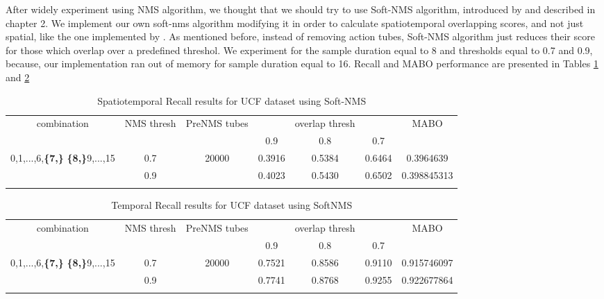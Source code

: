 After widely experiment using NMS algorithm, we thought that we should try to use Soft-NMS algorithm, introduced by \cite{DBLP:journals/corr/BodlaSCD17} and described in chapter 2. We implement our own soft-nms algorithm modifying it in order to calculate spatiotemporal overlapping
scores, and not just spatial, like the one implemented by \cite{DBLP:journals/corr/BodlaSCD17}. As mentioned before, instead of removing action tubes, Soft-NMS algorithm just reduces their score for those which overlap over a predefined threshol. We experiment for the sample duration
equal to 8 and thresholds equal to 0.7 and 0.9, because, our implementation ran out of memory for sample duration equal to 16.
Recall and MABO performance are presented in Tables \ref{table:ucf_softnms_recall} and \ref{table:ucf_softnms_temp_recall}

\begin{center}
  \setlength{\tabcolsep}{2pt}
\begin{longtable}{||c | c | c | c c c| c|}

  \hline
  \multirow{2}{*}{combination} & \multirow{2}{2.5em}{NMS thresh} & \multirow{2}{3.5em}{PreNMS tubes} &  {} &overlap thresh & {} & \multirow{2}{*}{MABO} \\
  {} & {} & {} &  0.9 &  0.8 & 0.7 & {}\\         
  \hline
  \multirow{2}{7em}{0,1,...,6,\textbf{\{7,\}}
  \textbf{\{8,\}}9,...,15 }  & 0.7 &\multirow{2}{*}{20000}  & 0.3916 & 0.5384 & 0.6464 & 0.3964639 \\
  \cline{2-2} \cline{4-7} 
  {} &  0.9   & {}   & 0.4023 & 0.5430 & 0.6502 & 0.398845313 \\
  \hline                                    

  \caption{Spatiotemporal Recall results for UCF dataset using Soft-NMS}
  \label{table:ucf_softnms_recall}
\end{longtable} 
\end{center}

\begin{center}
  \setlength{\tabcolsep}{2.2pt}
\begin{longtable}{||c | c | c | c c c| c|}

  \hline
  \multirow{2}{*}{combination} & \multirow{2}{2.5em}{NMS thresh} & \multirow{2}{3.5em}{PreNMS tubes} &  {} &overlap thresh & {} & \multirow{2}{*}{MABO} \\
  {} & {} & {} &  0.9 &  0.8 & 0.7 & {}\\         
  \hline

  \multirow{2}{7em}{0,1,...,6,\textbf{\{7,\}}
    \textbf{\{8,\}}9,...,15 }  & 0.7 &\multirow{2}{*}{20000}  & 0.7521 & 0.8586 & 0.9110 & 0.915746097  \\
  \cline{2-2} \cline{4-7} 
  {} &  0.9   & {}   & 0.7741 & 0.8768 & 0.9255 & 0.922677864 \\
  \hline                                    

  \caption{Temporal Recall results for UCF dataset using SoftNMS}
  \label{table:ucf_softnms_temp_recall}
\end{longtable} 
\end{center}

